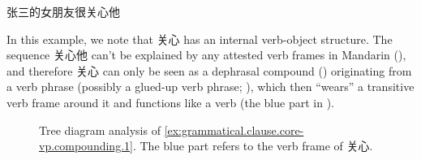 \documentclass[UTF8, a4paper, oneside, scheme=plain, 12pt]{ctexrep}
\begin{document}
\begin{exe}
    \ex\label{ex:grammatical.clause.core-vp.compounding.1} 张三的女朋友很关心他
\end{exe}

In this example, we note that 关心 has an internal verb-object structure.
The sequence 关心他 can't be explained by any attested verb frames in Mandarin
(),
and therefore 关心 can only be seen as a dephrasal compound ()
originating from a verb phrase
(possibly a glued-up verb phrase; ),
which then ``wears'' a transitive verb frame around it and functions like a verb
(the blue part in ).

\begin{figure}[H]
    {
        \centering
        \small
        
    }
    \caption{Tree diagram analysis of \eqref{ex:grammatical.clause.core-vp.compounding.1}.
    The blue part refers to the verb frame of 关心.}
    \label{fig:grammatical.clause.core-vp.compounding.1}
\end{figure}
\end{document}
